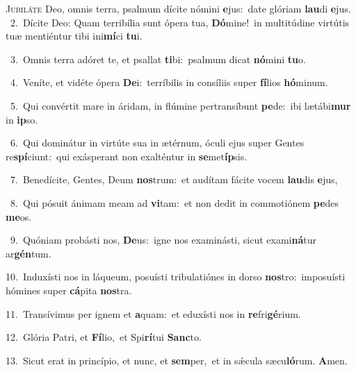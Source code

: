 \lettrine{\initial\textcolor{\initialcolor}{J}}{ubiláte} Deo, omnis terra, psalmum dícite nómini \textbf{e}\-jus:~\star date glóriam \textbf{lau}\-di \textbf{e}\-jus.\\
{\numbfont\textcolor{\numbcolor}{~2.}}~Dícite Deo: Quam terribília sunt ópera tua, \textbf{Dó}\-mine!~\star in multitúdine virtútis tuæ mentiéntur tibi ini\-\textbf{mí}\-ci \textbf{tu}\-i.\par
{\numbfont\textcolor{\numbcolor}{~3.}}~Omnis terra adóret te, et psallat \textbf{ti}\-bi:~\star psalmum dicat \textbf{nó}\-mini \textbf{tu}\-o.\par
{\numbfont\textcolor{\numbcolor}{~4.}}~Veníte, et vidéte ópera \textbf{De}\-i:~\star terríbilis in consíliis super \textbf{fí}\-lios \textbf{hó}\-minum.\par
{\numbfont\textcolor{\numbcolor}{~5.}}~Qui convértit mare in áridam, in flúmine pertransíbunt \textbf{pe}\-de:~\star ibi lætábi\textbf{mur} in \textbf{ip}\-so.\par
{\numbfont\textcolor{\numbcolor}{~6.}}~Qui dominátur in virtúte sua in ætérnum, óculi ejus super Gentes re\-\textbf{spí}\-ciunt:~\star qui exásperant non exalténtur in \textbf{se}\-met\-\textbf{íp}\-sis.\par
{\numbfont\textcolor{\numbcolor}{~7.}}~Benedícite, Gentes, Deum \textbf{nos}\-trum:~\star et audítam fácite vocem \textbf{lau}\-dis \textbf{e}\-jus,\par
{\numbfont\textcolor{\numbcolor}{~8.}}~Qui pósuit ánimam meam ad \textbf{vi}\-tam:~\star et non dedit in commotiónem \textbf{pe}\-des \textbf{me}\-os.\par
{\numbfont\textcolor{\numbcolor}{~9.}}~Quóniam probásti nos, \textbf{De}\-us:~\star igne nos examinásti, sicut exami\-\textbf{ná}\-tur ar\-\textbf{gén}\-tum.\par
{\numbfont\textcolor{\numbcolor}{10.}}~Induxísti nos in láqueum, posuísti tribulatiónes in dorso \textbf{nos}\-tro:~\star imposuísti hómines super \textbf{cá}\-pita \textbf{nos}\-tra.\par
{\numbfont\textcolor{\numbcolor}{11.}}~Transívimus per ignem et \textbf{a}\-quam:~\star et eduxísti nos in \textbf{re}\-fri\-\textbf{gé}\-rium.\par
{\numbfont\textcolor{\numbcolor}{12.}}~Glória Patri, et \textbf{Fí}\-lio,~\star et Spi\-\textbf{rí}\-tui \textbf{Sanc}\-to.\par
{\numbfont\textcolor{\numbcolor}{13.}}~Sicut erat in princípio, et nunc, et \textbf{sem}\-per,~\star et in sǽcula sæcu\-\textbf{ló}\-rum. \textbf{A}\-men.\par
